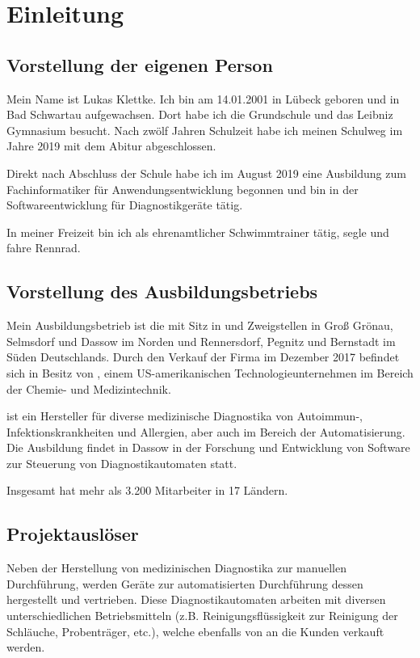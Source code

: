 \section{Einleitung}
\label{sec:Einleitung}

\subsection{Vorstellung der eigenen Person} 
\label{sec:eigene Person}
Mein Name ist Lukas Klettke. Ich bin am 14.01.2001 in Lübeck geboren und in Bad Schwartau aufgewachsen. Dort habe ich die Grundschule und das Leibniz Gymnasium besucht. Nach zwölf Jahren Schulzeit habe ich meinen Schulweg im Jahre 2019 mit dem Abitur abgeschlossen.

Direkt nach Abschluss der Schule habe ich im August 2019 eine Ausbildung zum Fachinformatiker für Anwendungsentwicklung begonnen und bin in der Softwareentwicklung für Diagnostikgeräte tätig.

In meiner Freizeit bin ich als ehrenamtlicher Schwimmtrainer tätig, segle und fahre Rennrad.

\subsection{Vorstellung des Ausbildungsbetriebs} 
\label{sec:Ausbildungsbetrieb}
Mein Ausbildungsbetrieb ist die {\betriebName} mit Sitz in {\betriebOrt} und Zweigstellen in Groß Grönau, Selmsdorf und Dassow im Norden und Rennersdorf, Pegnitz und Bernstadt im Süden Deutschlands. Durch den Verkauf der Firma im Dezember 2017 befindet sich {\betriebNameKzf} in Besitz von {\mutterBetriebName}, einem US-amerikanischen Technologieunternehmen im Bereich der Chemie- und Medizintechnik.

{\betriebNameKzf} ist ein Hersteller für diverse medizinische Diagnostika von Autoimmun-, Infektionskrankheiten und Allergien, aber auch im Bereich der Automatisierung. Die Ausbildung findet in Dassow in der Forschung und Entwicklung von Software zur Steuerung von Diagnostikautomaten statt.

Insgesamt hat {\betriebNameKzf} mehr als 3.200 Mitarbeiter in 17 Ländern.

\subsection{Projektauslöser} 
\label{sec:Projektauslöser}
Neben der Herstellung von medizinischen Diagnostika zur manuellen Durchführung, werden Geräte zur automatisierten Durchführung dessen hergestellt und vertrieben. Diese Diagnostikautomaten arbeiten mit diversen unterschiedlichen Betriebsmitteln (z.B. Reinigungsflüssigkeit zur Reinigung der Schläuche, Probenträger, etc.), welche ebenfalls von {\betriebNameKzf} an die Kunden verkauft werden.

